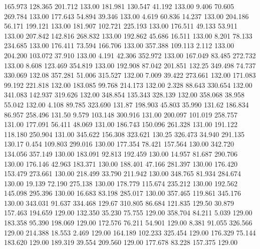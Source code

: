  165.973  128.365  201.712       133.00
 181.981  130.547   41.192       133.00
   9.406   70.605  269.784       133.00
 177.643   54.894   39.346       133.00
   4.619   60.836   14.237       133.00
 204.186   56.171  199.121       133.00
 181.907  102.721  225.193       133.00
 176.511   49.133   53.911       133.00
 207.842  142.816  268.832       133.00
 192.862   45.686   16.511       133.00
   8.201   78.133  234.685       133.00
 176.411   73.594  166.706       133.00
 357.388  109.113    2.112       133.00
 204.200  103.072   37.910       133.00
   4.191   42.306  352.972       133.00
 167.049   83.485  272.732       133.00
   8.608  123.469  354.819       133.00
 192.908   87.042  201.851       132.25
 349.498   74.737  330.069       132.08
 357.281   51.006  315.527       132.00
   7.009   39.422  273.661       132.00
 171.083   99.192  221.818       132.00
 183.085   99.768  214.173       132.00
   2.328   88.643  330.654       132.00
 341.083  142.937  319.626       132.00
 348.854  135.343  328.139       132.00
 358.068   38.958   55.042       132.00
   4.108   89.785  323.690       131.87
 198.903   45.803   35.990       131.62
 186.834   86.957  258.496       131.50
   9.579  103.148  300.916       131.00
 200.097  101.019  258.757       131.00
 177.091   56.411   48.069       131.00
 186.743  150.096  261.328       131.00
 191.122  118.180  250.904       131.00
 345.622  156.308  323.621       130.25
 326.473   34.940  291.135       130.17
   0.454  109.803  299.016       130.00
 177.354   78.421  157.564       130.00
 342.720  134.056  357.149       130.00
 183.091   92.813  192.459       130.00
  14.957   81.687  290.706       130.00
 176.146   42.963  183.371       130.00
 188.401   47.166  281.397       130.00
 176.420  153.479  273.661       130.00
 218.499   33.790  211.942       130.00
 348.765   81.934  284.674       130.00
  19.139   72.190  275.138       130.00
 178.779  115.674  235.212       130.00
 192.562  145.098  295.396       130.00
  16.683   83.198  285.017       130.00
 357.465  119.861  345.176       130.00
 343.031   91.637  334.468       129.67
 310.805   86.684  121.835       129.50
  30.879  157.463  194.659       129.00
 132.350   35.230   75.755       129.00
 358.704   84.211    5.039       129.00
 183.358   95.390  198.069       129.00
 172.576   76.211   54.901       129.00
   8.381   91.055  326.566       129.00
 214.388   18.553    2.469       129.00
 164.189  102.233  325.454       129.00
 176.329   75.144  183.620       129.00
 189.319   39.554  209.560       129.00
 177.678   83.228  157.375       129.00
